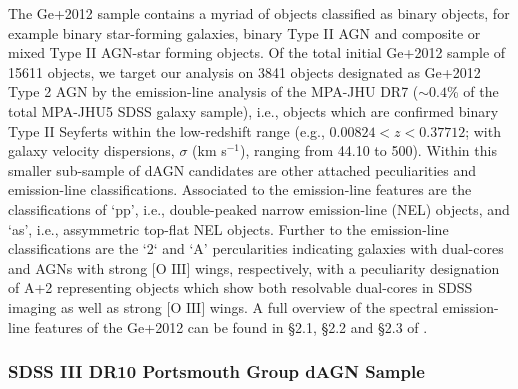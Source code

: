 The Ge+2012 sample contains a myriad of objects classified as binary objects, for example binary star-forming galaxies, binary Type II AGN and composite or mixed Type II AGN-star forming objects. Of the total initial Ge+2012 sample of 15611 objects, we target our analysis on 3841 objects designated as Ge+2012 Type 2 AGN by the emission-line analysis of the MPA-JHU DR7 ($\sim{0.4}$\% of the total MPA-JHU5 SDSS galaxy sample), i.e., objects which are confirmed binary Type II Seyferts within the low-redshift range (e.g., $0.00824{<}z{<}0.37712$; with galaxy velocity dispersions, $\sigma$ (km s$^{-1}$), ranging from 44.10 to 500). Within this smaller sub-sample of dAGN candidates are other attached peculiarities and emission-line classifications. Associated to the emission-line features are the classifications of `pp', i.e., double-peaked narrow emission-line (NEL) objects, and `as', i.e., assymmetric top-flat NEL objects. Further to the emission-line classifications are the `2` and `A' percularities indicating galaxies with dual-cores and AGNs with strong $\text{[O III]}$ wings, respectively, with a peculiarity designation of A+2 representing objects which show both resolvable dual-cores in SDSS imaging as well as strong $\text{[O III]}$ wings. A full overview of the spectral emission-line features of the Ge+2012 can be found in §2.1, §2.2 and §2.3 of \cite{Ge_Hu_Wang_Bai_Zhang_2012}.   

\subsubsection{SDSS III DR10 Portsmouth Group dAGN Sample}




